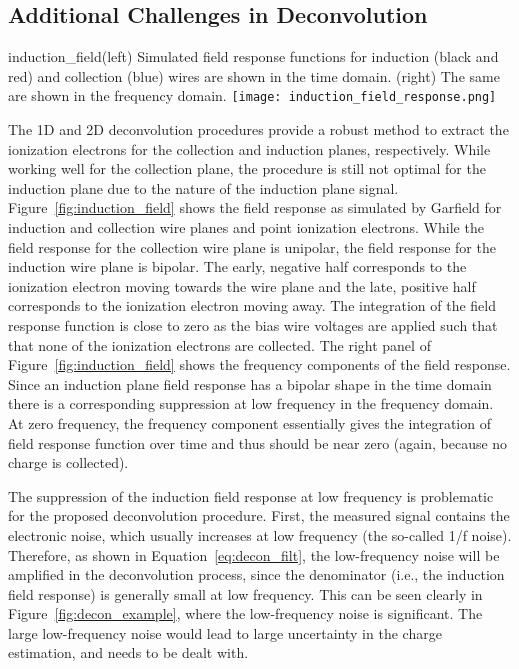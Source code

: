 \subsection{Additional Challenges in Deconvolution}

\begin{cdrfigure}{induction_field}{(left) Simulated field response functions for induction (black and red) and 
collection (blue) wires are shown in the time domain. (right) The same are shown in 
the frequency domain.}
\texttt{[image: induction\_field\_response.png]}
\end{cdrfigure}


The 1D and 2D deconvolution procedures provide a robust method to extract the ionization
electrons for the collection and induction planes, respectively. 
%
While working well for the collection plane, the procedure is still not optimal 
for the induction plane due to the nature of the induction plane signal. 
Figure~\ref{fig:induction_field} shows the field response as simulated by Garfield 
for induction and collection wire planes and point ionization
electrons. While the field response for the collection wire plane is unipolar, the field 
response for the induction wire plane is bipolar. 
%
The early, negative half corresponds to the ionization electron moving
towards the wire plane and the late, positive half corresponds
to the ionization electron moving away.
%
The integration of the field response function is close to zero
as the bias wire voltages are applied such that that none of the ionization electrons are
collected. The right panel of Figure~\ref{fig:induction_field} shows the 
frequency components of the field response. 
%
Since an induction plane field response has a bipolar shape in the time domain 
there is a corresponding suppression at low frequency in the frequency 
domain. At zero frequency, the frequency component essentially gives the 
integration of field response function over time and thus should be near 
zero (again, because no charge is collected).


The suppression of the induction field response at low frequency is problematic for the
proposed deconvolution procedure. First,  the measured signal contains the electronic noise, 
which usually increases at low frequency (the so-called 1/f noise). Therefore, as shown in 
Equation~\eqref{eq:decon_filt}, the low-frequency noise will be amplified in the deconvolution 
process, since the denominator (i.e., the induction field response) is generally small at 
low frequency. This can be seen clearly in Figure~\ref{fig:decon_example}, where the low-frequency noise
is significant. The large low-frequency noise would lead to large uncertainty 
in the charge estimation, and needs to be dealt with.  

